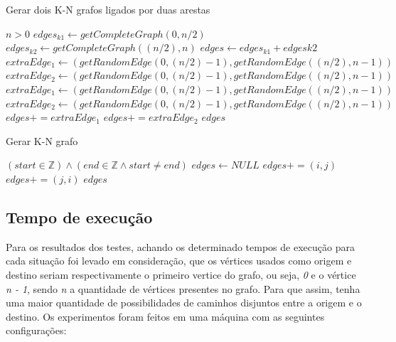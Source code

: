 \begin{algorithm}[H]
\caption{Gerar dois K-N grafos ligados por duas arestas}
\begin{algorithmic}[1] 
    \REQUIRE $n > 0$
    \STATE $edges_{k1} \leftarrow getCompleteGraph(0, n / 2)$
    \STATE $edges_{k2} \leftarrow getCompleteGraph((n / 2), n)$
    \STATE $edges \leftarrow edges_{k1}+edges{k2}$
    \STATE $extraEdge_1 \leftarrow (getRandomEdge(0, (n / 2) - 1), getRandomEdge((n / 2), n - 1))$ 
    \STATE $extraEdge_2 \leftarrow (getRandomEdge(0, (n / 2) - 1), getRandomEdge((n / 2), n - 1))$
        \STATE $extraEdge_1 \leftarrow (getRandomEdge(0, (n / 2) - 1), getRandomEdge((n / 2), n - 1))$ 
        \STATE $extraEdge_2 \leftarrow (getRandomEdge(0, (n / 2) - 1), getRandomEdge((n / 2), n - 1))$
    \ENDWHILE
    \STATE $edges \mathrel{{+}{=}} extraEdge_1$
    \STATE $edges \mathrel{{+}{=}} extraEdge_2$        
    \RETURN $edges$

\end{algorithmic}
\end{algorithm}

\begin{algorithm}[H]
\caption{Gerar K-N grafo}
\begin{algorithmic}[1]
\REQUIRE $(start \in \mathbb{Z}) \land (end \in \mathbb{Z} \land start \neq end)$
\STATE $edges \leftarrow NULL$
     \STATE $edges \mathrel{{+}{=}} (i, j)$
      \STATE $edges \mathrel{{+}{=}} (j, i)$
\ENDIF
\ENDFOR
\ENDFOR
\RETURN $edges$
\end{algorithmic}
\end{algorithm}

\subsection{Tempo de execução}

Para os resultados dos testes, achando os determinado tempos de execução para cada situação foi levado em consideração, que os vértices usados como origem e destino seriam respectivamente o primeiro vertice do grafo, ou seja, \textit{0} e o vértice \textit{n - 1}, sendo  \textit{n} a quantidade de vértices presentes no grafo. Para que assim, tenha uma maior quantidade de possibilidades de caminhos disjuntos entre a origem e o destino. Os experimentos foram feitos em uma máquina com as seguintes configurações:

